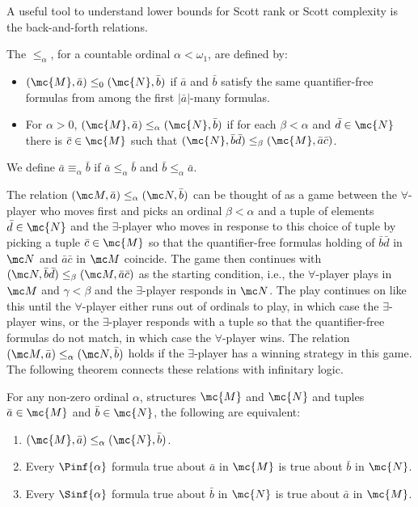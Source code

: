 \documentclass{amsart}
\renewcommand{\-}{\text{-}}
\begin{document}
A useful tool to understand lower bounds for Scott rank or Scott complexity is the back-and-forth relations.
\begin{definition}
The  $\leq_\alpha$, for a countable ordinal $\alpha < \omega_1$, are defined by:
    \begin{itemize}
        \item $(\mc{M},\bar{a}) \leq_0 (\mc{N},\bar{b})$ if $\bar{a}$ and $\bar{b}$ satisfy the same quantifier-free formulas from among the first $|\bar{a}|$-many formulas.
        \item For $\alpha > 0$, $(\mc{M},\bar{a}) \leq_\alpha (\mc{N},\bar{b})$ if for each $\beta < \alpha$ and $\bar{d} \in \mc{N}$ there is $\bar{c} \in \mc{M}$ such that $(\mc{N},\bar{b} \bar{d}) \leq_\beta (\mc{M},\bar{a} \bar{c})$.
    \end{itemize}
We define $\bar{a} \equiv_\alpha \bar{b}$ if $\bar{a} \leq_\alpha \bar{b}$ and $\bar{b} \leq_\alpha \bar{a}$.
\end{definition}

The relation $(\mc M,\bar a)\leq_\alpha (\mc N,\bar b)$ can be thought of as a game between the $\forall$-player who moves first and picks an ordinal  $\beta<\alpha$ and a tuple of elements $\bar d\in\mc{N}$ and the $\exists$-player who moves in response to this choice of tuple by picking a tuple $\bar c\in \mc{M}$ so that the quantifier-free formulas holding of $\bar b\bar d$ in $\mc N$ and $\bar a \bar c$ in $\mc M$ coincide. The game then continues with $(\mc N,\bar b\bar d)\leq_\beta (\mc M,\bar a\bar c)$ as the starting condition, i.e., the $\forall$-player plays in $\mc M$ and $\gamma<\beta$ and the $\exists$-player responds in $\mc N$. The play continues on like this until the $\forall$-player either runs out of ordinals to play, in which case the $\exists$-player wins, or the $\exists$-player responds with a tuple so that the quantifier-free formulas do not match, in which case the $\forall$-player wins.
The relation $(\mc M,\bar a)\leq_\alpha(\mc N,\bar b)$ holds if the $\exists$-player has a winning strategy in this game.
The following theorem connects these relations with infinitary logic.

\begin{theorem}
For any non-zero ordinal $\alpha$, structures $\mc{M}$ and $\mc{N}$ and tuples $\bar{a}\in\mc{M}$ and $\bar{b}\in\mc{N}$, the following are equivalent:
    \begin{enumerate}
	\item $(\mc{M},\bar{a})\leq_\alpha (\mc{N},\bar{b})$.
	\item Every $\Pinf{\alpha}$ formula true about $\bar{a}$ in $\mc{M}$ is true about $\bar{b}$ in $\mc{N}$.
	\item Every $\Sinf{\alpha}$ formula true about $\bar{b}$ in $\mc{N}$ is true about $\bar{a}$ in $\mc{M}$.
    \end{enumerate} 
\end{theorem}
\end{document}
